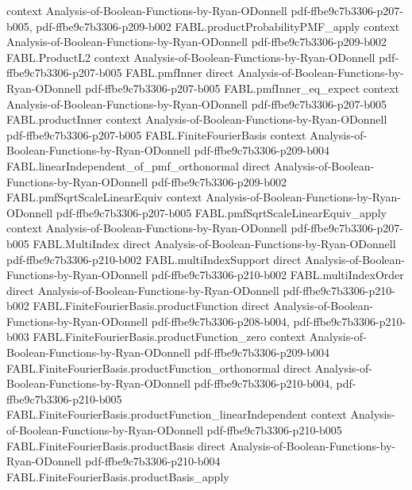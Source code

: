 \begin{theorem}
  {context}
  {Analysis-of-Boolean-Functions-by-Ryan-ODonnell}
  {pdf-ffbe9c7b3306-p207-b005,
    pdf-ffbe9c7b3306-p209-b002}
\proofstep
  {FABL.productProbabilityPMF_apply}
  {context}
  {Analysis-of-Boolean-Functions-by-Ryan-ODonnell}
  {pdf-ffbe9c7b3306-p209-b002}
\proofstep
  {FABL.ProductL2}
  {context}
  {Analysis-of-Boolean-Functions-by-Ryan-ODonnell}
  {pdf-ffbe9c7b3306-p207-b005}
\proofstep
  {FABL.pmfInner}
  {direct}
  {Analysis-of-Boolean-Functions-by-Ryan-ODonnell}
  {pdf-ffbe9c7b3306-p207-b005}
\proofstep
  {FABL.pmfInner_eq_expect}
  {context}
  {Analysis-of-Boolean-Functions-by-Ryan-ODonnell}
  {pdf-ffbe9c7b3306-p207-b005}
\proofstep
  {FABL.productInner}
  {context}
  {Analysis-of-Boolean-Functions-by-Ryan-ODonnell}
  {pdf-ffbe9c7b3306-p207-b005}
\proofstep
  {FABL.FiniteFourierBasis}
  {context}
  {Analysis-of-Boolean-Functions-by-Ryan-ODonnell}
  {pdf-ffbe9c7b3306-p209-b004}
\proofstep
  {FABL.linearIndependent_of_pmf_orthonormal}
  {direct}
  {Analysis-of-Boolean-Functions-by-Ryan-ODonnell}
  {pdf-ffbe9c7b3306-p209-b002}
\proofstep
  {FABL.pmfSqrtScaleLinearEquiv}
  {context}
  {Analysis-of-Boolean-Functions-by-Ryan-ODonnell}
  {pdf-ffbe9c7b3306-p207-b005}
\proofstep
  {FABL.pmfSqrtScaleLinearEquiv_apply}
  {context}
  {Analysis-of-Boolean-Functions-by-Ryan-ODonnell}
  {pdf-ffbe9c7b3306-p207-b005}
\proofstep
  {FABL.MultiIndex}
  {direct}
  {Analysis-of-Boolean-Functions-by-Ryan-ODonnell}
  {pdf-ffbe9c7b3306-p210-b002}
\proofstep
  {FABL.multiIndexSupport}
  {direct}
  {Analysis-of-Boolean-Functions-by-Ryan-ODonnell}
  {pdf-ffbe9c7b3306-p210-b002}
\proofstep
  {FABL.multiIndexOrder}
  {direct}
  {Analysis-of-Boolean-Functions-by-Ryan-ODonnell}
  {pdf-ffbe9c7b3306-p210-b002}
\proofstep
  {FABL.FiniteFourierBasis.productFunction}
  {direct}
  {Analysis-of-Boolean-Functions-by-Ryan-ODonnell}
  {pdf-ffbe9c7b3306-p208-b004,
    pdf-ffbe9c7b3306-p210-b003}
\proofstep
  {FABL.FiniteFourierBasis.productFunction_zero}
  {context}
  {Analysis-of-Boolean-Functions-by-Ryan-ODonnell}
  {pdf-ffbe9c7b3306-p209-b004}
\proofstep
  {FABL.FiniteFourierBasis.productFunction_orthonormal}
  {direct}
  {Analysis-of-Boolean-Functions-by-Ryan-ODonnell}
  {pdf-ffbe9c7b3306-p210-b004,
    pdf-ffbe9c7b3306-p210-b005}
\proofstep
  {FABL.FiniteFourierBasis.productFunction_linearIndependent}
  {context}
  {Analysis-of-Boolean-Functions-by-Ryan-ODonnell}
  {pdf-ffbe9c7b3306-p210-b005}
\proofstep
  {FABL.FiniteFourierBasis.productBasis}
  {direct}
  {Analysis-of-Boolean-Functions-by-Ryan-ODonnell}
  {pdf-ffbe9c7b3306-p210-b004}
\proofstep
  {FABL.FiniteFourierBasis.productBasis_apply}

\end{theorem}
